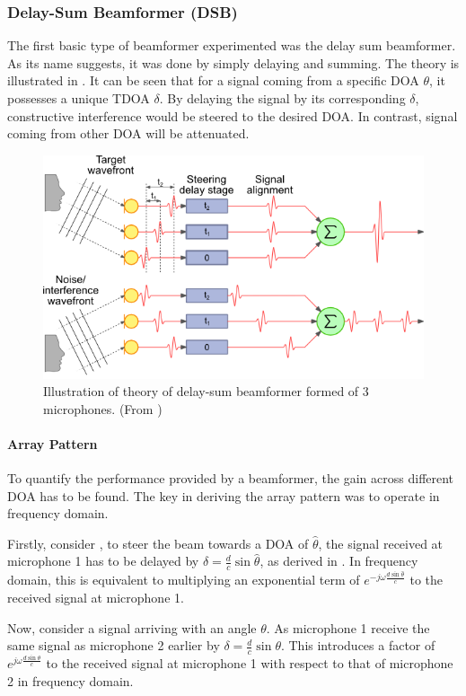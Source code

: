 \documentclass[a4paper,twoside,12pt,hidelinks]{article}
\begin{document}
\subsubsection{Delay-Sum Beamformer (DSB)}
The first basic type of beamformer experimented was the delay sum beamformer. As its name suggests, it was done by simply delaying and summing. The theory is illustrated in . It can be seen that for a signal coming from a specific DOA $\theta$, it possesses a unique TDOA $\delta$. By delaying the signal by its corresponding $\delta$, constructive interference would be steered to the desired DOA. In contrast, signal coming from other DOA will be attenuated.
\begin{figure}[H]
\centering
\includegraphics[width=0.7\linewidth]{steer}
\caption{Illustration of theory of delay-sum beamformer formed of 3 microphones. (From \cite{TheLabBookPagesDelayCalculation})}
\label{fig:dsb}
\end{figure}
\paragraph{Array Pattern}
To quantify the performance provided by a beamformer, the gain across different DOA has to be found. The key in deriving the array pattern was to operate in frequency domain. 

Firstly, consider , to steer the beam towards a DOA of $\hat{\theta}$, the signal received at microphone 1 has to be delayed by $\hat{\delta}=\frac{d}{c}\sin\hat{\theta}$, as derived in . In frequency domain, this is equivalent to multiplying an exponential term of $e^{-j\omega\frac{d\sin\hat{\theta}}{c}}$ to the received signal at microphone 1. 

Now, consider a signal arriving with an angle $\theta$. As microphone 1 receive the same signal as microphone 2 earlier by $\delta=\frac{d}{c}\sin\theta$. This introduces a factor of $e^{j\omega\frac{d\sin\theta}{c}}$ to the received signal at microphone 1 with respect to that of microphone 2 in frequency domain.
\end{document}
